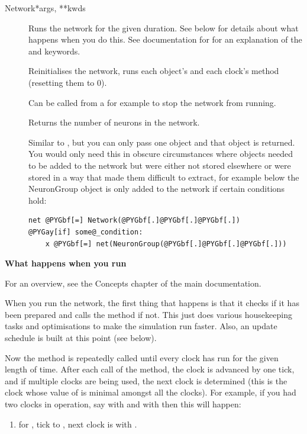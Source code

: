 \documentclass[letterpaper,10pt,english]{manual}
\begin{document}
\begin{classdesc}{Network}{*args, **kwds}
\begin{description}
\item[]
Runs the network for the given duration. See below for details about
what happens when you do this. See documentation for \hyperlink{brian.run}{} for
an explanation of the  and  keywords.

\item[]
Reinitialises the network, runs each object's  and each
clock's  method (resetting them to 0).

\item[]
Can be called from a \hyperlink{brian.network_operation}{} for example to stop the
network from running.

\item[]
Returns the number of neurons in the network.

\item[]
Similar to , but you can only pass one object and that
object is returned. You would only need this in obscure
circumstances where objects needed to be added to the network
but were either not stored elsewhere or were stored in a way
that made them difficult to extract, for example below the
NeuronGroup object is only added to the network if certain
conditions hold:

\begin{Verbatim}[commandchars=@\[\]]
net @PYGbf[=] Network(@PYGbf[.]@PYGbf[.]@PYGbf[.])
@PYGay[if] some@_condition:
    x @PYGbf[=] net(NeuronGroup(@PYGbf[.]@PYGbf[.]@PYGbf[.]))
\end{Verbatim}

\end{description}

\textbf{What happens when you run}

For an overview, see the Concepts chapter of the main documentation.

When you run the network, the first thing that happens is that it
checks if it has been prepared and calls the  method
if not. This just does various housekeeping tasks and optimisations
to make the simulation run faster. Also, an update schedule is
built at this point (see below).

Now the  method is repeatedly called until every clock
has run for the given length of time. After each call of the
 method, the clock is advanced by one tick, and if
multiple clocks are being used, the next clock is determined (this
is the clock whose value of  is minimal amongst all the clocks).
For example, if you had two clocks in operation, say  with
 and  with  then this will happen:
\begin{enumerate}
\item {} 
 for , tick  to , next
clock is  with .


\end{enumerate}
\end{classdesc}
\end{document}
